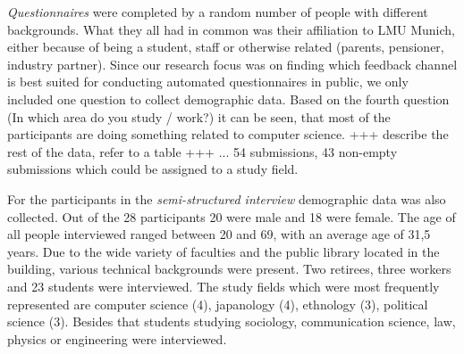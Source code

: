 		\textit{Questionnaires} were completed by a random number of people with different backgrounds. What they all had in common was their affiliation to LMU Munich, either because of being a student, staff or otherwise related (parents, pensioner, industry partner). Since our research focus was on finding which feedback channel is best suited for conducting automated questionnaires in public, we only included one question to collect demographic data. Based on the fourth question (In which area do you study / work?) it can be seen, that most of the participants are doing something related to computer science.
			+++ describe the rest of the data, refer to a table +++
		 ... 
			54 submissions, 43 non-empty submissions which could be assigned to a study field.

		For the participants in the \textit{semi-structured interview} demographic data was also collected. Out of the 28 participants
		20 were male and 18 were female. The age of all people interviewed ranged between 20 and 69, with an average age of 31,5 years.
		Due to the wide variety of faculties and the public library located in the building, various technical backgrounds were present. Two retirees, three workers and 23 students were interviewed. The study fields which were most frequently represented are computer science (4), japanology (4), ethnology (3), political science (3). Besides that students studying sociology, communication science, law, physics or engineering were interviewed.



